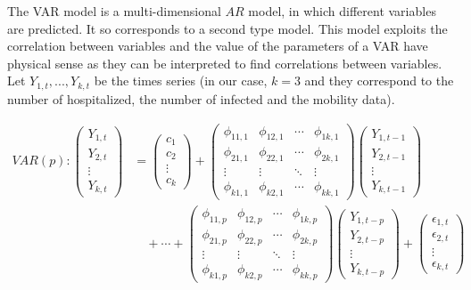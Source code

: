 The VAR model is a multi-dimensional $AR$ model, in which different variables are predicted. 
It so corresponds to a second type model. 
This model exploits the correlation between variables and the value of the parameters of a VAR have physical sense as they can be interpreted to find correlations between variables. 
Let $Y_{1,t}, ..., Y_{k,t}$ be the times series (in our case, $k=3$ and they correspond to the number of hospitalized, the number of infected and the mobility data).




\begin{equation*}
\begin{aligned}
VAR(p) : 
\begin{pmatrix}
Y_{1,t} \\
Y_{2,t} \\
\vdots \\
Y_{k,t}
\end{pmatrix}
&=
\begin{pmatrix}
c_1 \\
c_2 \\
\vdots \\
c_k
\end{pmatrix}
+
\begin{pmatrix}
\phi_{11,1} & \phi_{12,1} & \cdots & \phi_{1k,1} \\
\phi_{21,1} & \phi_{22,1} & \cdots & \phi_{2k,1} \\
\vdots & \vdots & \ddots & \vdots \\
\phi_{k1,1} & \phi_{k2,1} & \cdots & \phi_{kk,1}
\end{pmatrix}
\begin{pmatrix}
Y_{1,t-1} \\
Y_{2,t-1} \\
\vdots \\
Y_{k,t-1}
\end{pmatrix} \\
&\quad + \cdots 
+ 
\begin{pmatrix}
\phi_{11,p} & \phi_{12,p} & \cdots & \phi_{1k,p} \\
\phi_{21,p} & \phi_{22,p} & \cdots & \phi_{2k,p} \\
\vdots & \vdots & \ddots & \vdots \\
\phi_{k1,p} & \phi_{k2,p} & \cdots & \phi_{kk,p}
\end{pmatrix}
\begin{pmatrix}
Y_{1,t-p} \\
Y_{2,t-p} \\
\vdots \\
Y_{k,t-p}
\end{pmatrix}
+
\begin{pmatrix}
\epsilon_{1,t} \\
\epsilon_{2,t} \\
\vdots \\
\epsilon_{k,t}
\end{pmatrix}
\end{aligned}
\end{equation*}
    


